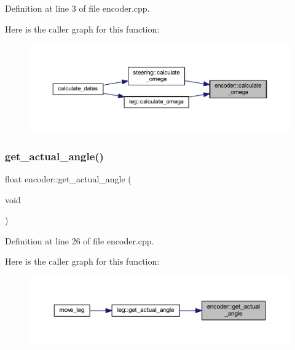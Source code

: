Definition at line 3 of file encoder.\+cpp.

Here is the caller graph for this function\+:
\nopagebreak
\begin{figure}[H]
\begin{center}
\leavevmode
\includegraphics[width=350pt]{classencoder_a8e8856a7fba7d2d7d11c1a1b2428b246_icgraph}
\end{center}
\end{figure}
\mbox{\label{classencoder_a16dcda920abca2cbdb950a8124bce297}} 
\subsubsection{\texorpdfstring{get\_actual\_angle()}{get\_actual\_angle()}}
{\footnotesize\ttfamily float encoder\+::get\+\_\+actual\+\_\+angle (\begin{DoxyParamCaption}\item[{void}]{ }\end{DoxyParamCaption})}



Definition at line 26 of file encoder.\+cpp.

Here is the caller graph for this function\+:
\nopagebreak
\begin{figure}[H]
\begin{center}
\leavevmode
\includegraphics[width=350pt]{classencoder_a16dcda920abca2cbdb950a8124bce297_icgraph}
\end{center}
\end{figure}
\mbox{\label{classencoder_aba5b6ccdb374d7fcc5d9f2abab1a59da}} 
